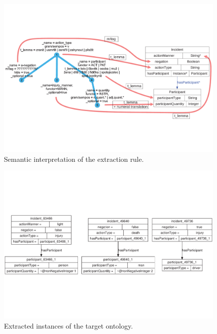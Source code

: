 \begin{figure}[b!]
	\centering
		\includegraphics[angle=-90, width=\hsize]{semantic_interpretation}
	\caption{Semantic interpretation of the extraction rule.}
	\label{fig:manual_semantic_interpretation}
\end{figure}


\begin{figure}
	\centering
		\includegraphics[angle=-90, width=\hsize]{instances}
	\caption{Extracted instances of the target ontology.}
	\label{fig:manual_instatnces}
\end{figure}


